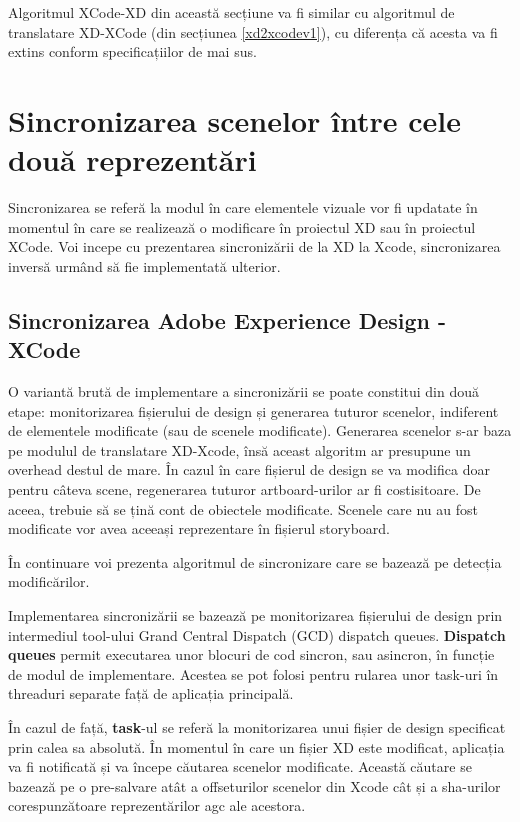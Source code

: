 Algoritmul XCode-XD din această secțiune va fi similar cu algoritmul de translatare XD-XCode (din secțiunea \ref{xd2xcodev1}), cu diferența că acesta va fi extins conform specificațiilor de mai sus.

\section{Sincronizarea scenelor între cele două reprezentări} \label{syncme}

Sincronizarea se referă la modul în care elementele vizuale vor fi updatate în momentul în care se realizează o modificare în proiectul XD sau în proiectul XCode.
Voi incepe cu prezentarea sincronizării de la XD la Xcode, sincronizarea inversă urmând să fie implementată ulterior.

\subsection{Sincronizarea Adobe Experience Design - XCode}

O variantă brută de implementare a sincronizării se poate constitui din două etape: monitorizarea fișierului de design și generarea tuturor scenelor, indiferent de elementele modificate (sau de scenele modificate). Generarea scenelor s-ar baza pe modulul de translatare XD-Xcode, însă aceast algoritm ar presupune un overhead destul de mare. În cazul în care fișierul de design se va modifica doar pentru câteva scene, regenerarea tuturor artboard-urilor ar fi costisitoare. De aceea, trebuie să se țină cont de obiectele modificate. Scenele care nu au fost modificate vor avea aceeași reprezentare în fișierul storyboard.

În continuare voi prezenta algoritmul de sincronizare care se bazează pe detecția modificărilor.

Implementarea sincronizării se bazează pe monitorizarea fișierului de design prin intermediul tool-ului Grand Central Dispatch (GCD) dispatch queues. \textbf{Dispatch queues} permit executarea unor blocuri de cod sincron, sau asincron, în funcție de modul de implementare. Acestea se pot folosi pentru rularea unor task-uri în threaduri separate față de aplicația principală. 

În cazul de față, \textbf{task}-ul se referă la monitorizarea unui fișier de design specificat prin calea sa absolută. În momentul în care un fișier XD este modificat, aplicația va fi notificată și va începe căutarea scenelor modificate. 
Această căutare se bazează pe o pre-salvare atât a offseturilor scenelor din Xcode cât și a sha-urilor corespunzătoare reprezentărilor agc ale acestora. 

